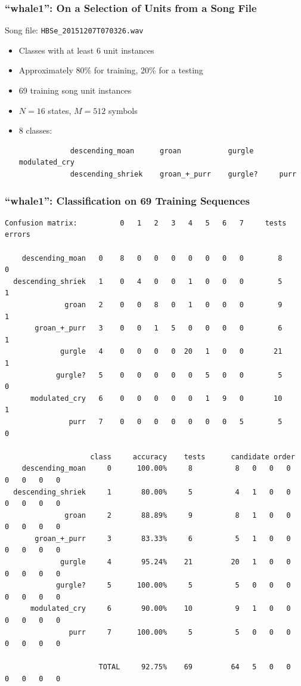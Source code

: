 \documentclass{beamer}
\begin{document}
\begin{frame}[fragile]
\frametitle{``whale1'': On a Selection of Units from a Song File}

Song file: \verb|HBSe_20151207T070326.wav|

\begin{itemize}
    \item Classes with at least 6 unit instances
    \item Approximately 80\% for training, 20\% for a testing
    \item 69 training song unit instances
    \item $N = 16$ states, $M = 512$ symbols
    \item
        8 classes:
            \tiny{
            \begin{verbatim}
            descending_moan      groan           gurgle      modulated_cry
            descending_shriek    groan_+_purr    gurgle?     purr
            \end{verbatim}
            }
\end{itemize}


\end{frame}

\begin{frame}[fragile]
    \frametitle{``whale1'': Classification on 69 Training Sequences}

    \tiny{
    \begin{verbatim}
Confusion matrix:          0   1   2   3   4   5   6   7     tests   errors

    descending_moan   0    8   0   0   0   0   0   0   0        8       0
  descending_shriek   1    0   4   0   0   1   0   0   0        5       1
              groan   2    0   0   8   0   1   0   0   0        9       1
       groan_+_purr   3    0   0   1   5   0   0   0   0        6       1
             gurgle   4    0   0   0   0  20   1   0   0       21       1
            gurgle?   5    0   0   0   0   0   5   0   0        5       0
      modulated_cry   6    0   0   0   0   0   1   9   0       10       1
               purr   7    0   0   0   0   0   0   0   5        5       0

                    class     accuracy    tests      candidate order
    descending_moan     0      100.00%     8          8   0   0   0   0   0   0   0
  descending_shriek     1       80.00%     5          4   1   0   0   0   0   0   0
              groan     2       88.89%     9          8   1   0   0   0   0   0   0
       groan_+_purr     3       83.33%     6          5   1   0   0   0   0   0   0
             gurgle     4       95.24%    21         20   1   0   0   0   0   0   0
            gurgle?     5      100.00%     5          5   0   0   0   0   0   0   0
      modulated_cry     6       90.00%    10          9   1   0   0   0   0   0   0
               purr     7      100.00%     5          5   0   0   0   0   0   0   0

                      TOTAL     92.75%    69         64   5   0   0   0   0   0   0
    \end{verbatim}
    }

\end{frame}
\end{document}
